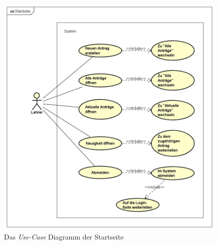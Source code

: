 \begin{figure}[H]
	\centering
	\includegraphics[width=1\linewidth]{images/ldehner_konzept/uc-start}
	\caption[\textit{Use-Case} Diagramm Startseite]{Das\textit{ Use-Case} Diagramm der Startseite}
	\label{fig:ucStart}
\end{figure}
